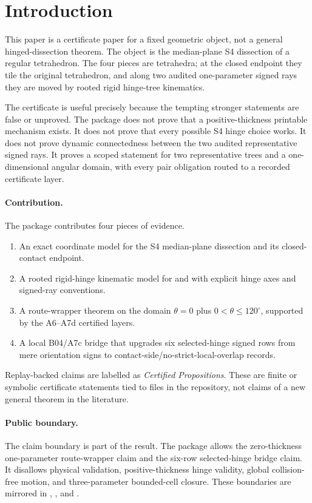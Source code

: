 \section{Introduction}
\label{sec:introduction}

This paper is a certificate paper for a fixed geometric object, not a general
hinged-dissection theorem.  The object is the median-plane S4 dissection of a
regular tetrahedron.  The four pieces are tetrahedra; at the closed endpoint
they tile the original tetrahedron, and along two audited one-parameter signed
rays they are moved by rooted rigid hinge-tree kinematics.

The certificate is useful precisely because the tempting stronger statements
are false or unproved.  The package does not prove that a positive-thickness
printable mechanism exists.  It does not prove that every possible S4 hinge
choice works.  It does not prove dynamic connectedness between the two audited
representative signed rays.  It proves a scoped statement for two representative
trees and a one-dimensional angular domain, with every pair obligation routed
to a recorded certificate layer.

\paragraph{Contribution.}
The package contributes four pieces of evidence.
\begin{enumerate}[leftmargin=*]
  \item An exact coordinate model for the S4 median-plane dissection and its
  closed-contact endpoint.
  \item A rooted rigid-hinge kinematic model for \treeA{} and \treeB{} with
  explicit hinge axes and signed-ray conventions.
  \item A route-wrapper theorem on the domain
  \(\theta=0\) plus \(0<\theta\le 120^\circ\), supported by the A6--A7d
  certified layers.
  \item A local B04/A7c bridge that upgrades six selected-hinge signed rows
  from mere orientation signs to contact-side/no-strict-local-overlap records.
\end{enumerate}

Replay-backed claims are labelled as \emph{Certified Propositions}.  These are
finite or symbolic certificate statements tied to files in the repository, not
claims of a new general theorem in the literature.

\paragraph{Public boundary.}
The claim boundary is part of the result.  The package allows the zero-thickness
one-parameter route-wrapper claim and the six-row selected-hinge bridge claim.
It disallows physical validation, positive-thickness hinge validity, global
collision-free motion, and three-parameter bounded-cell closure.  These
boundaries are mirrored in ,
, and .

